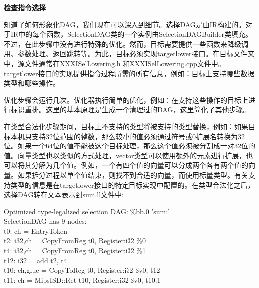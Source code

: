 \hspace*{\fill} \par %
\textbf{检查指令选择}

知道了如何形象化DAG，我们现在可以深入到细节。选择DAG是由IR构建的。对于IR中的每个函数，SelectionDAG类的一个实例由SelectionDAGBuilder类填充。不过，在此步骤中没有进行特殊的优化。然而，目标需要提供一些函数来降级调用、参数处理、返回跳转等。为此，目标必须实现targetlower接口。在目标文件夹中，源文件通常在XXXISelLowering.h 和XXXISelLowering.cpp文件中。targetlower接口的实现提供指令过程所需的所有信息，例如：目标上支持哪些数据类型和哪些操作。\par

优化步骤会运行几次。优化器执行简单的优化，例如：在支持这些操作的目标上进行标识重排。这里的基本原理是生成一个清理过的DAG，这里简化了其他步骤。\par

在类型合法化步骤期间，目标上不支持的类型将被支持的类型替换，例如：如果目标本机只支持32位范围的整数，那么较小的值必须通过符号或0扩展名转换为32位。如果一个64位的值不能被这个目标处理，那么这个值必须被分割成一对32位的值。向量类型也以类似的方式处理，vector类型可以使用额外的元素进行扩展，也可以将其分解为几个值。例如，一个有四个值的向量可以分成两个各有两个值的向量。如果拆分过程以单个值结束，则找不到合适的向量，而使用标量类型。有关支持类型的信息是在targetlower接口的特定目标实现中配置的。在类型合法化之后，选择DAG转存文本表示到sum.ll文件中:\par

\begin{tcolorbox}[colback=white,colframe=black]
Optimized type-legalized selection DAG: \%bb.0 'sum:' \\
SelectionDAG has 9 nodes: \\
\hspace*{0.5cm}t0: ch = EntryToken \\
\hspace*{1.5cm}t2: i32,ch = CopyFromReg t0, Register:i32 \%0 \\
\hspace*{1.5cm}t4: i32,ch = CopyFromReg t0, Register:i32 \%1 \\
\hspace*{1cm}t12: i32 = add t2, t4 \\
\hspace*{0.5cm}t10: ch,glue = CopyToReg t0, Register:i32 \$v0, t12 \\
\hspace*{0.5cm}t11: ch = MipsISD::Ret t10, Register:i32 \$v0, t10:1
\end{tcolorbox}

